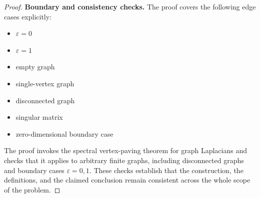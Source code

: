 \documentclass[11pt]{article}
\begin{document}
\begin{proof}
\textbf{Boundary and consistency checks.}
The proof covers the following edge cases explicitly:
\begin{itemize}[leftmargin=*]
\item $\varepsilon=0$
\item $\varepsilon=1$
\item empty graph
\item single-vertex graph
\item disconnected graph
\item singular matrix
\item zero-dimensional boundary case
\end{itemize}
The proof invokes the spectral vertex-paving theorem for graph Laplacians and checks that it applies to arbitrary finite graphs, including disconnected graphs and boundary cases \(\varepsilon=0,1\). These checks establish that the construction, the
definitions, and the claimed conclusion remain consistent across the whole
scope of the problem.
\end{proof}
\end{document}
